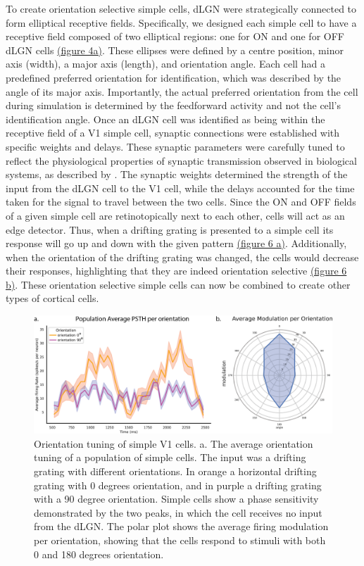 \documentclass[12pt]{article}
\begin{document}
To create orientation selective simple cells, dLGN were strategically connected to form elliptical receptive fields. Specifically, we designed each simple cell to have a receptive field composed of two elliptical regions: one for ON and one for OFF dLGN cells \hyperref[fig:LIF_connectivity]{(figure 4a)}. These ellipses were defined by a centre position, minor axis (width), a major axis (length), and orientation angle. Each cell had a predefined preferred orientation for identification, which was described by the angle of its major axis. Importantly, the actual preferred orientation from the cell during simulation is determined by the feedforward activity and not the cell's identification angle. Once an dLGN cell was identified as being within the receptive field of a V1 simple cell, synaptic connections were established with specific weights and delays. These synaptic parameters were carefully tuned to reflect the physiological properties of synaptic transmission observed in biological systems, as described by \textcite{durandComparisonVisualResponse2016}. The synaptic weights determined the strength of the input from the dLGN cell to the V1 cell, while the delays accounted for the time taken for the signal to travel between the two cells. Since the ON and OFF fields of a given simple cell are retinotopically next to each other, cells will act as an edge detector. Thus, when a drifting grating is presented to a simple cell its response will go up and down with the given pattern \hyperref[fig:simple cell orientation tuning]{(figure 6 a)}. Additionally, when the orientation of the drifting grating was changed, the cells would decrease their responses, highlighting that they are indeed orientation selective \hyperref[fig:simple cell orientation tuning]{(figure 6 b)}. These orientation selective simple cells can now be combined to create other types of cortical cells.

\begin{figure}[H]
    \centering
    \includegraphics[width=1.0 \textwidth]{figures/figure_simple_orientation_tuning.png}
    \caption{Orientation tuning of simple V1 cells. a. The average orientation tuning of a population of simple cells. The input was a drifting grating with different orientations. In orange a horizontal drifting grating with 0 degrees orientation, and in purple a drifting grating with a 90 degree orientation. Simple cells show a phase sensitivity demonstrated by the two peaks, in which the cell receives no input from the dLGN. The polar plot shows the average firing modulation per orientation, showing that the cells respond to stimuli with both 0 and 180 degrees orientation.}
    \label{fig:simple cell orientation tuning}
\end{figure}
\end{document}
